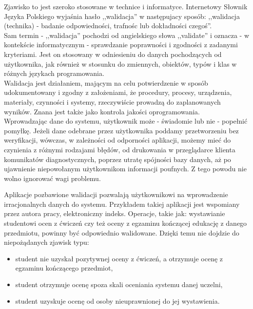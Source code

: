 \documentclass[brudnopis]{xmgr}
\begin{document}
\indent \textcolor{wa}{Zjawisko to jest szeroko stosowane w technice i informatyce. Internetowy Słownik
Języka Polskiego wyjaśnia hasło ,,walidacja'' w następujacy sposób: ,,walidacja
(technika) - badanie odpowiedności, trafnośc lub dokładności czegoś''.\cite{ValidationSJP}}
\\
\indent \textcolor{wa}{Sam termin - ,,walidacja'' pochodzi od angielskiego słowa ,,validate'' i oznacza -
w kontekście informatycznym - sprawdzanie poprawności i zgodności z zadanymi
kryteriami. Jest on stosowany w odniesieniu do danych pochodzących od użytkownika,
jak również w stosunku do zmiennych, obiektów, typów i klas w różnych językach
programowania.\cite{ValidationTermin}}
\\
\indent \textcolor{wa}{Walidacja jest działaniem, mającym na celu potwierdzenie w sposób udokumentowany
i zgodny z założeniami, że procedury, procesy, urządzenia, materiały, czynności
i systemy, rzeczywiście prowadzą do zaplanowanych wyników. Znana jest także jako
kontrola jakości oprogramowania.\cite{Validation2}}
\\
\indent \textcolor{wa}{Wprowadzając dane do systemu, użytkownik może - świadomie lub nie - popełnić
pomyłkę. Jeżeli dane odebrane przez użytkownika poddamy przetworzeniu bez weryfikacji,
wówczas, w zależności od odporności aplikacji, możemy mieć do czynienia z różnymi
rodzajami błędów, od drukowania w przeglądarce klienta komunikatów diagnostycznych,
poprzez utratę spójności bazy danych, aż po ujawnienie niepowołanym użytkownikom
informacji poufnych. Z tego powodu nie wolno ignorować wagi problemu.}
\\
\indent \textcolor{wc}{Aplikacje pozbawione walidacji pozwalają użytkownikowi na wprowadzenie irracjonalnych
danych do systemu. Przykładem takiej aplikacji jest wspomiany przez autora pracy,
elektroniczny indeks. Operacje, takie jak: wystawianie studentowi ocen z ćwiczeń
czy też oceny z egzaminu kończącej edukację z danego przedmiotu, powinny być
odpowiednio walidowane. Dzięki temu nie dojdzie do niepożądanych zjawisk typu:
\begin{itemize}
\item student nie uzyskał pozytywnej oceny z ćwiczeń, a otrzymuje ocenę z egzaminu
kończącego przedmiot,
\item student otrzymuje ocenę spoza skali oceniania systemu danej uczelni,
\item student uzyskuje ocenę od osoby nieuprawnionej do jej wystawienia.
\end{itemize}}
\end{document}

